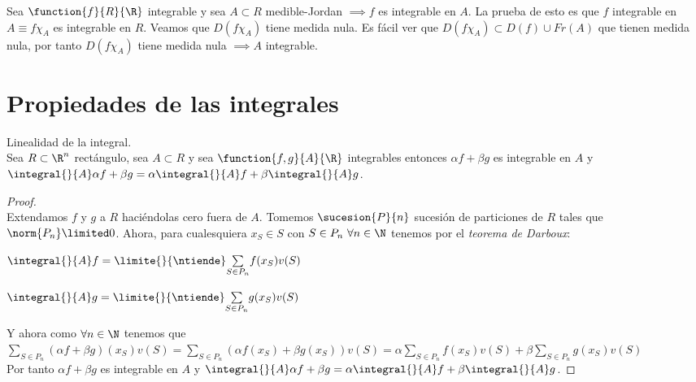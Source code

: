 	\begin{observacion} Sea $\function{f}{R}{\R}$ integrable y sea $A\subset R$ medible-Jordan $\implies f$ es integrable en $A$. La prueba de esto es que $f$ integrable en $A\equiv f\chi_A$ es integrable en $R$. Veamos que $D(f\chi_A)$ tiene medida nula. Es fácil ver que $D(f\chi_A)\subset D(f)\cup Fr(A)$ que tienen medida nula, por tanto $D(f\chi_A)$ tiene medida nula $\implies A$ integrable.	
	\end{observacion}
	
	\section{Propiedades de las integrales}
	
	\begin{proposicion} Linealidad de la integral.\\
	Sea $R\subset \R^n$ rectángulo, sea $A\subset R$ y sea $\function{f,g}{A}{\R}$ integrables entonces $\alpha f+\beta g$ es integrable en $A$ y $\integral{}{A}\alpha f+\beta g=\alpha\integral{}{A}f+\beta\integral{}{A}g$.	
	\begin{proof}\ \\
	Extendamos $f$ y $g$ a $R$ haciéndolas cero fuera de $A$. Tomemos $\sucesion{P}{n}$ sucesión de particiones de $R$ tales que $\norm{P_n}\limited 0$. Ahora, para cualesquiera $x_S\in S$ con $S\in P_n\ \forall n\in\N$ tenemos por el \textit{teorema de Darboux}:
	\begin{center}
	$\integral{}{A}f=\limite{}{\ntiende}\underset{S\in P_n}\sum f(x_S)v(S)$
	\end{center}
	\begin{center}
	$\integral{}{A}g=\limite{}{\ntiende}\underset{S\in P_n}\sum g(x_S)v(S)$
	\end{center}
	Y ahora como $\forall n\in\N$ tenemos que $\underset{S\in P_n}\sum (\alpha f + \beta g)(x_S)v(S)=\underset{S\in P_n}\sum (\alpha f(x_S)+\beta g(x_S))v(S)=\alpha\underset{S\in P_n}\sum f(x_S)v(S)+\beta\underset{S\in P_n}\sum g(x_S)v(S)$\\
	Por tanto $\alpha f+\beta g$ es integrable en $A$ y $\integral{}{A}\alpha f+\beta g=\alpha\integral{}{A}f+\beta\integral{}{A}g$.
	\end{proof}
	\end{proposicion}
	
